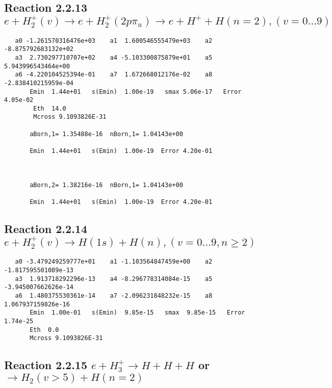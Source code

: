 \documentclass[12pt,dvipdfm]{article}
\begin{document}
\newpage
\subsection{
Reaction 2.2.13 $ e + H_2^+(v) \rightarrow e + H_2^+(2p\pi_u) \rightarrow e + H^+ + H(n=2),  (v=0\ldots 9)$}



\begin{small}\begin{verbatim}
   a0 -1.261570316476e+03    a1  1.600546555479e+03    a2 -8.875792683132e+02
   a3  2.730297710707e+02    a4 -5.103300875879e+01    a5  5.943996543464e+00
   a6 -4.220104525394e-01    a7  1.672668012176e-02    a8 -2.838410215959e-04
       Emin  1.44e+01   s(Emin)  1.00e-19   smax 5.06e-17   Error 4.05e-02
        Eth  14.0
        Mcross 9.1093826E-31

       aBorn,1= 1.35488e-16  nBorn,1= 1.04143e+00

       Emin  1.44e+01   s(Emin)  1.00e-19  Error 4.20e-01



       aBorn,2= 1.38216e-16  nBorn,1= 1.04143e+00

       Emin  1.44e+01   s(Emin)  1.00e-19  Error 4.20e-01

\end{verbatim}\end{small}




\newpage
\subsection{
Reaction 2.2.14 $   e + H_2^+(v) \rightarrow H(1s) + H(n), (v=0\ldots 9, n\geq 2)$}



\begin{small}\begin{verbatim}
   a0 -3.479249259777e+01    a1 -1.103564847459e+00    a2 -1.817595501089e-13
   a3  1.913718292296e-13    a4 -8.296778314084e-15    a5 -3.945007662626e-14
   a6  1.480375530361e-14    a7 -2.096231848232e-15    a8  1.067937159826e-16
       Emin  1.00e-01   s(Emin)  9.85e-15   smax  9.85e-15   Error  1.74e-25
       Eth  0.0
       Mcross 9.1093826E-31
\end{verbatim}\end{small}


\newpage
\subsection{
Reaction 2.2.15 $   e + H_3^+ \rightarrow  H + H + H$ or $\rightarrow H_2(v > 5) + H(n=2)$}
\end{document}

